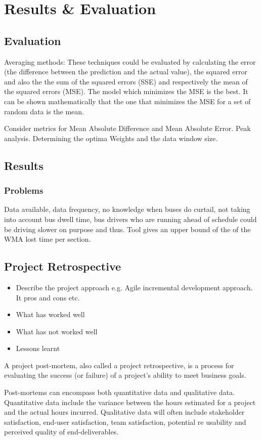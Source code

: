 \chapter{Results \& Evaluation}

\section{Evaluation}

Averaging methods: These techniques could be evaluated by calculating the error (the difference between the prediction and the actual value), the squared error and also the the sum of the squared errors (SSE) and respectively the mean of the squared errors (MSE).
The model which minimizes the MSE is the best. It can be shown mathematically that the one that minimizes the MSE for a set of random data is the mean.

Consider metrics for Mean Absolute Difference and Mean Absolute Error. Peak analysis.
Determining the optima Weights and the data window size.
\section{Results}

\subsection{Problems}
Data available, data frequency, no knowledge when buses do curtail, not taking into account bus dwell time, bus drivers who are running ahead of schedule could be driving slower on purpose and thus. Tool gives an upper bound of the of the WMA lost time per section. 


\section{Project Retrospective}
\begin{itemize}
	\item Describe the project approach e.g. Agile incremental development approach. It pros and cons etc. 
	\item What has worked well
	\item What has not worked well
	\item Lessons learnt
\end{itemize}

A project post-mortem, also called a project retrospective, is a process for evaluating the success (or failure) of a project's ability to meet business goals. 

Post-mortems can encompass both quantitative data and qualitative data. Quantitative data include the variance between the hours estimated for a project and the actual hours incurred. Qualitative data will often include stakeholder satisfaction, end-user satisfaction, team satisfaction, potential re usability and perceived quality of end-deliverables.